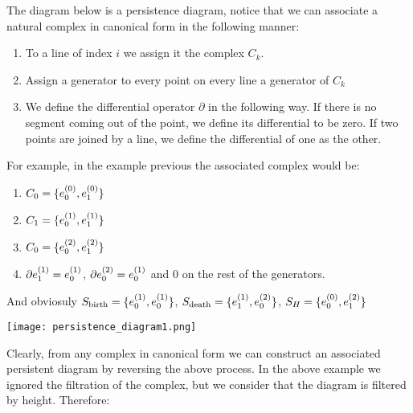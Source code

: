 \begin{example}
The diagram below is a persistence diagram, notice that we can associate a natural 
complex in canonical form in the following manner:

\begin{enumerate}


\item To a line of index $i$ we assign
it the complex $C_k$.

\item Assign a generator to every point on every line a generator of $C_k$

\item We define the differential operator $\partial$
in the following way. If there is no segment coming out of the point, we define its differential to be zero.
If two points are joined by a line, we define the differential of one as the other.

\end{enumerate}

For example, in the example previous the associated complex would be:

\begin{enumerate}

\item $C_0 = \{e_{0}^{(0)},e_{1}^{(0)}\}$

\item $C_1 = \{e_{0}^{(1)},e_{1}^{(1)}\}$

\item $C_0 = \{e_{0}^{(2)},e_{1}^{(2)}\}$

\item $\partial e_{1}^{(1)}=e_{0}^{(1)}$, $\partial e_{0}^{(2)}=e_{0}^{(1)}$ and 
$0$ on the rest of the generators.
\end{enumerate}

And obviosuly $S_{\text{birth}}=\{
e_{0}^{(1)},
e_{0}^{(1)}
\}$,
$S_{\text{death}}=\{
e_{1}^{(1)},
e_{0}^{(2)}
\}$,
$
S_H=\{
e_{0}^{(0)},
e_{1}^{(2)}
\}
$

\end{example}

\begin{center}
\texttt{[image: persistence\_diagram1.png]}
\end{center}


Clearly, from any complex in canonical form we can construct an associated persistent diagram by reversing the above process.
In the above example we ignored the filtration of the complex, but we consider that the diagram is filtered by height.
 Therefore:

